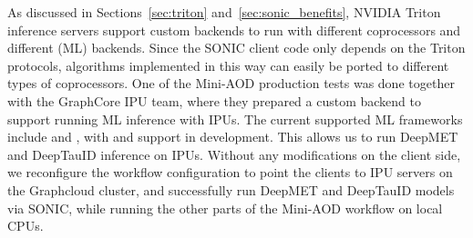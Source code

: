 As discussed in Sections~\ref{sec:triton} and~\ref{sec:sonic_benefits}, NVIDIA Triton inference servers support custom backends to run with different coprocessors and different (ML) backends. Since the SONIC client code only depends on the Triton protocols, algorithms implemented in this way can easily be ported to different types of coprocessors. One of the Mini-AOD production tests was done together with the GraphCore IPU team, where they prepared a custom backend to support running ML inference with IPUs. The current supported ML frameworks include \TENSORFLOW and \PYTORCH, with \ONNX and \PYTORCHGEOMETRIC support in development. This allows us to run DeepMET and DeepTauID inference on IPUs. Without any modifications on the client side, we reconfigure the workflow configuration to point the clients to IPU servers on the Graphcloud cluster, and successfully run DeepMET and DeepTauID models via SONIC, while running the other parts of the Mini-AOD workflow on local CPUs.
